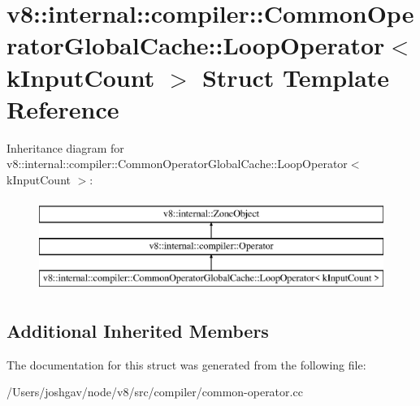 \hypertarget{structv8_1_1internal_1_1compiler_1_1_common_operator_global_cache_1_1_loop_operator}{}\section{v8\+:\+:internal\+:\+:compiler\+:\+:Common\+Operator\+Global\+Cache\+:\+:Loop\+Operator$<$ k\+Input\+Count $>$ Struct Template Reference}
\label{structv8_1_1internal_1_1compiler_1_1_common_operator_global_cache_1_1_loop_operator}
Inheritance diagram for v8\+:\+:internal\+:\+:compiler\+:\+:Common\+Operator\+Global\+Cache\+:\+:Loop\+Operator$<$ k\+Input\+Count $>$\+:\begin{figure}[H]
\begin{center}
\leavevmode
\includegraphics[height=3.000000cm]{structv8_1_1internal_1_1compiler_1_1_common_operator_global_cache_1_1_loop_operator}
\end{center}
\end{figure}
\subsection*{Additional Inherited Members}


The documentation for this struct was generated from the following file\+:\begin{DoxyCompactItemize}
\item 
/\+Users/joshgav/node/v8/src/compiler/common-\/operator.\+cc\end{DoxyCompactItemize}
